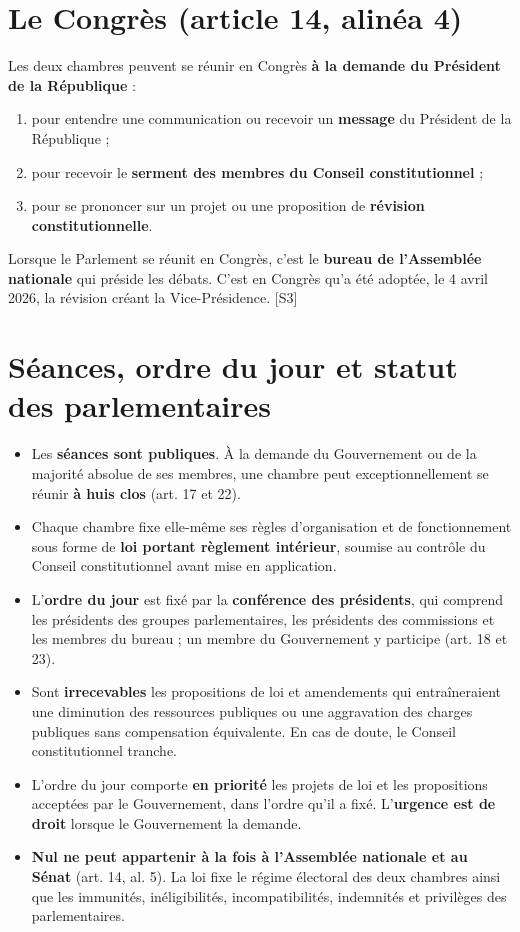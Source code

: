 \documentclass[11pt,a4paper,oneside]{report}
\newcommand{\src}[1]{\textcolor{bluec}{\scriptsize[#1]}}
\begin{document}
\section{Le Congrès (article 14, alinéa 4)}
Les deux chambres peuvent se réunir en Congrès \textbf{à la demande du Président de la République} :

\begin{enumerate}
  \item pour entendre une communication ou recevoir un \textbf{message} du Président de la République ;
  \item pour recevoir le \textbf{serment des membres du Conseil constitutionnel} ;
  \item pour se prononcer sur un projet ou une proposition de \textbf{révision constitutionnelle}.
\end{enumerate}
Lorsque le Parlement se réunit en Congrès, c'est le \textbf{bureau de l'Assemblée nationale} qui préside les débats. C'est en Congrès qu'a été adoptée, le 4 avril 2026, la révision créant la Vice-Présidence. \src{S3}

\section{Séances, ordre du jour et statut des parlementaires}
\begin{itemize}
  \item Les \textbf{séances sont publiques}. À la demande du Gouvernement ou de la majorité absolue de ses membres, une chambre peut exceptionnellement se réunir \textbf{à huis clos} (art. 17 et 22).
  \item Chaque chambre fixe elle-même ses règles d'organisation et de fonctionnement sous forme de \textbf{loi portant règlement intérieur}, soumise au contrôle du Conseil constitutionnel avant mise en application.
  \item L'\textbf{ordre du jour} est fixé par la \textbf{conférence des présidents}, qui comprend les présidents des groupes parlementaires, les présidents des commissions et les membres du bureau ; un membre du Gouvernement y participe (art. 18 et 23).
  \item Sont \textbf{irrecevables} les propositions de loi et amendements qui entraîneraient une diminution des ressources publiques ou une aggravation des charges publiques sans compensation équivalente. En cas de doute, le Conseil constitutionnel tranche.
  \item L'ordre du jour comporte \textbf{en priorité} les projets de loi et les propositions acceptées par le Gouvernement, dans l'ordre qu'il a fixé. L'\textbf{urgence est de droit} lorsque le Gouvernement la demande.
  \item \textbf{Nul ne peut appartenir à la fois à l'Assemblée nationale et au Sénat} (art. 14, al. 5). La loi fixe le régime électoral des deux chambres ainsi que les immunités, inéligibilités, incompatibilités, indemnités et privilèges des parlementaires.
\end{itemize}
\end{document}
